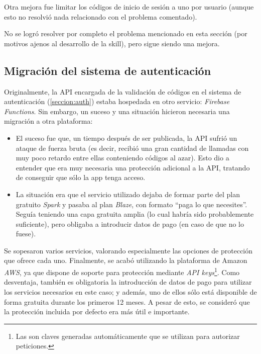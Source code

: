 \documentclass[11pt,spanish,listoffigures,listoftables,table,hyphens,dvipsnames]{tfgetsinf}
\newcommand{\fe}[1]{\foreign{english}{#1}}
\begin{document}
Otra mejora fue limitar los códigos de inicio de sesión a uno por usuario (aunque esto no resolvió nada relacionado con el problema comentado).

No se logró resolver por completo el problema mencionado en esta sección (por motivos ajenos al desarrollo de la skill), pero sigue siendo una mejora.

\subsection{Migración del sistema de autenticación}
\label{seccion:migracion-auth}

Originalmente, la API encargada de la validación de códigos en el sistema de autenticación (\ref{seccion:auth}) estaba hospedada en otro servicio: \emph{Firebase Functions}. Sin embargo, un suceso y una situación hicieron necesaria una migración a otra plataforma:

\begin{itemize}
   \item El suceso fue que, un tiempo después de ser publicada, la API sufrió un ataque de fuerza bruta (es decir, recibió una gran cantidad de llamadas con muy poco retardo entre ellas conteniendo códigos al azar). Esto dio a entender que era muy necesaria una protección adicional a la API, tratando de conseguir que sólo la app tenga acceso.
   \item La situación era que el servicio utilizado dejaba de formar parte del plan gratuito \emph{Spark} y pasaba al plan \emph{Blaze}, con formato ``paga lo que necesites''. Seguía teniendo una capa gratuita amplia (lo cual habría sido probablemente suficiente), pero obligaba a introducir datos de pago (en caso de que no lo fuese).
\end{itemize}

Se sopesaron varios servicios, valorando especialmente las opciones de protección que ofrece cada uno. Finalmente, se acabó utilizando la plataforma de Amazon \emph{AWS}, ya que dispone de soporte para protección mediante \emph{API keys}\footnote{Las \fe{API keys} son claves generadas automáticamente que se utilizan para autorizar peticiones.}. Como desventaja, también es obligatoria la introducción de datos de pago para utilizar los servicios necesarios en este caso; y además, uno de ellos sólo está disponible de forma gratuita durante los primeros 12 meses. A pesar de esto, se consideró que la protección incluida por defecto era más útil e importante.


\end{document}
